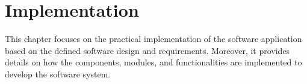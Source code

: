 \chapter{Implementation}
This chapter focuses on the practical implementation of the software application based on the defined software design and requirements.
Moreover, it provides details on how the components, modules, and functionalities are implemented to develop the software system.







